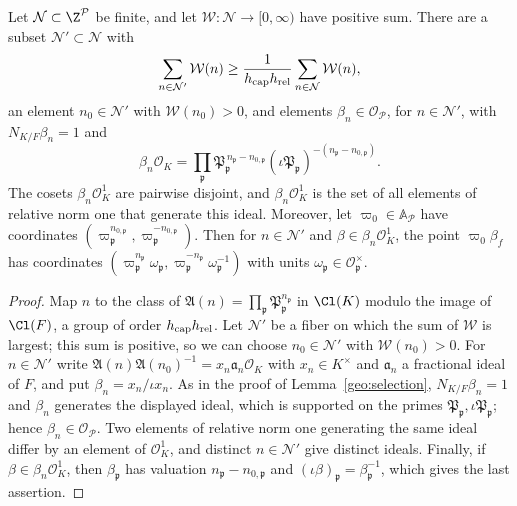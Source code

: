 \begin{lemma}\label{fw:selection}
Let $\mathcal N\subset\Z^{\mathcal P}$ be finite, and let
$\mathcal W\colon\mathcal N\to[0,\infty)$ have positive sum. There are a
subset $\mathcal N'\subset\mathcal N$ with
\[
 \sum_{n\in\mathcal N'}\mathcal W(n)\ge\frac1{h_{\rm cap}h_{\rm rel}}
 \sum_{n\in\mathcal N}\mathcal W(n),
\]
an element $n_0\in\mathcal N'$ with $\mathcal W(n_0)>0$, and elements
$\beta_n\in\mathcal O_{\mathcal P}$, for $n\in\mathcal N'$, with $N_{K/F}\beta_n=1$ and
\[
 \beta_n\mathcal O_K=\prod_{\mathfrak p}\mathfrak P_{\mathfrak
 p}^{\,n_{\mathfrak p}-n_{0,\mathfrak p}}
 (\iota\mathfrak P_{\mathfrak p})^{-(n_{\mathfrak p}-n_{0,\mathfrak p})}.
\]
The cosets $\beta_n\mathcal O_K^1$ are pairwise disjoint, and
$\beta_n\mathcal O_K^1$ is the set of all elements of relative norm one
that generate this ideal. Moreover, let $\varpi_0\in\mathbb A_{\mathcal
P}$ have coordinates $(\varpi_{\mathfrak p}^{n_{0,\mathfrak
p}},\varpi_{\mathfrak p}^{-n_{0,\mathfrak p}})$. Then for $n\in\mathcal
N'$ and $\beta\in\beta_n\mathcal O_K^1$, the point $\varpi_0\beta_f$ has
coordinates $(\varpi_{\mathfrak p}^{n_{\mathfrak p}}\omega_{\mathfrak
p},\varpi_{\mathfrak p}^{-n_{\mathfrak p}}\omega_{\mathfrak p}^{-1})$
with units $\omega_{\mathfrak p}\in\mathcal O_{\mathfrak p}^\times$.
\end{lemma}

\begin{proof}
Map $n$ to the class of $\mathfrak A(n)=\prod_{\mathfrak p}\mathfrak
P_{\mathfrak p}^{n_{\mathfrak p}}$ in $\Cl(K)$ modulo the image of
$\Cl(F)$, a group of order $h_{\rm cap}h_{\rm rel}$. Let $\mathcal N'$ be a
fiber on which the sum of $\mathcal W$ is largest; this sum is positive,
so we can choose $n_0\in\mathcal N'$ with $\mathcal W(n_0)>0$. For
$n\in\mathcal N'$ write $\mathfrak A(n)\mathfrak
A(n_0)^{-1}=x_n\mathfrak a_n\mathcal O_K$ with $x_n\in K^\times$ and
$\mathfrak a_n$ a fractional ideal of $F$, and put
$\beta_n=x_n/\iota x_n$. As in the proof of Lemma~\ref{geo:selection},
$N_{K/F}\beta_n=1$ and $\beta_n$ generates the displayed ideal, which
is supported on the primes $\mathfrak P_{\mathfrak p},\iota\mathfrak
P_{\mathfrak p}$; hence $\beta_n\in\mathcal O_{\mathcal P}$. Two elements of relative
norm one generating the same ideal differ by an element of $\mathcal
O_K^1$, and distinct $n\in\mathcal N'$ give distinct ideals. Finally, if
$\beta\in\beta_n\mathcal O_K^1$, then $\beta_{\mathfrak p}$ has
valuation $n_{\mathfrak p}-n_{0,\mathfrak p}$ and $(\iota\beta)_{\mathfrak
p}=\beta_{\mathfrak p}^{-1}$, which gives the last assertion.
\end{proof}

